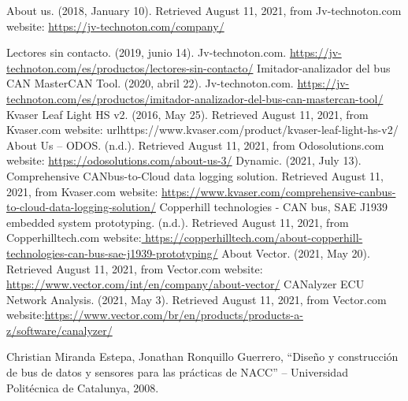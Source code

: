 \begin{thebibliography}{99}









  About us. (2018, January 10). Retrieved August 11, 2021, from Jv-technoton.com website: \url{https://jv-technoton.com/company/}

Lectores sin contacto. (2019, junio 14). Jv-technoton.com. \url{https://jv-technoton.com/es/productos/lectores-sin-contacto/}
Imitador-analizador del bus CAN MasterCAN Tool. (2020, abril 22). Jv-technoton.com. \url{https://jv-technoton.com/es/productos/imitador-analizador-del-bus-can-mastercan-tool/}
 Kvaser Leaf Light HS v2. (2016, May 25). Retrieved August 11, 2021, from Kvaser.com website: url{https://www.kvaser.com/product/kvaser-leaf-light-hs-v2/}
  About Us – ODOS. (n.d.). Retrieved August 11, 2021, from Odosolutions.com website: \url{https://odosolutions.com/about-us-3/}
 Dynamic. (2021, July 13). Comprehensive CANbus-to-Cloud data logging solution. Retrieved August 11, 2021, from Kvaser.com website: \url{ https://www.kvaser.com/comprehensive-canbus-to-cloud-data-logging-solution/}
Copperhill technologies - CAN bus, SAE J1939 embedded system prototyping. (n.d.). Retrieved August 11, 2021, from Copperhilltech.com website:\url{ https://copperhilltech.com/about-copperhill-technologies-can-bus-sae-j1939-prototyping/}
 About Vector. (2021, May 20). Retrieved August 11, 2021, from Vector.com website: \url{https://www.vector.com/int/en/company/about-vector/}
 CANalyzer ECU Network Analysis. (2021, May 3). Retrieved August 11, 2021, from Vector.com website:\url{https://www.vector.com/br/en/products/products-a-z/software/canalyzer/}



 Christian Miranda Estepa, Jonathan Ronquillo Guerrero, “Diseño y construcción de bus de datos y sensores para las prácticas de NACC” – Universidad Politécnica de Catalunya, 2008.


\end{thebibliography}
